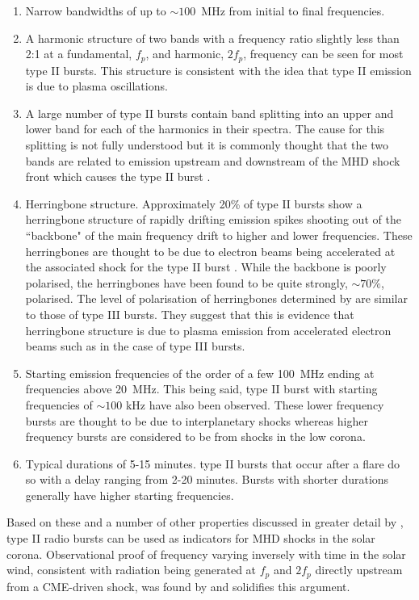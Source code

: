 \begin{enumerate}
    \item Narrow bandwidths of up to $\sim 100$~MHz from initial to final frequencies.
    \item A harmonic structure of two bands with a frequency ratio slightly less than 2:1 at a fundamental, $f_p$, and harmonic, $2f_p$, frequency can be seen for most type II bursts. This structure is consistent with the idea that type II emission is due to plasma oscillations.
    \item A large number of type II bursts contain band splitting into an upper and lower band for each of the harmonics in their spectra. The cause for this splitting is not fully understood but it is commonly thought that the two bands are related to emission upstream and downstream of the MHD shock front which causes the type II burst \citep{Smerd1974,NelsonandMelrose1985, Vrsnak2002}.
    \item Herringbone structure. Approximately 20\% of type II bursts show a herringbone structure of rapidly drifting emission spikes shooting out of the ``backbone" of the main frequency drift to higher and lower frequencies. These herringbones are thought to be due to electron beams being accelerated at the associated shock for the type II burst \citep{Mann1995}. While the backbone is poorly polarised, the herringbones have been found to be quite strongly, $\sim 70\%$, polarised. The level of polarisation of herringbones determined by \cite{Suzuki1980} are similar to those of type III bursts. They suggest that this is evidence that herringbone structure is due to plasma emission from accelerated electron beams such as in the case of type III bursts. 
    \item Starting emission frequencies of the order of a few 100~MHz ending at frequencies above 20~MHz. This being said, type II burst with starting frequencies of $\sim 100$ kHz have also been observed. 
    These lower frequency bursts are thought to be due to interplanetary shocks whereas higher frequency bursts are considered to be from shocks in the low corona.
    \item Typical durations of 5-15 minutes. type II bursts that occur after a flare do so with a delay ranging from 2-20 minutes. Bursts with shorter durations generally have higher starting frequencies. %
\end{enumerate}
 
Based on these and a number of other properties discussed in greater detail by \cite{NelsonandMelrose1985}, type II radio bursts can be used as indicators for MHD shocks in the solar corona. Observational proof of frequency varying inversely with time in the solar wind, consistent with radiation being generated at $f_p$ and $2f_p$ directly upstream from a CME-driven shock, was found by \cite{Reiner1997} and solidifies this argument.
